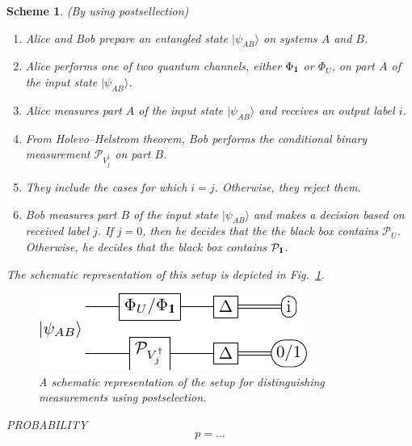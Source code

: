 \documentclass[preprint,12pt, a4paper]{elsarticle}
\newcommand{\ket}[1]{\ensuremath{|#1\rangle}}
\newcommand{\1}{{\rm 1\hspace{-0.9mm}l}}
\newcommand{\Id}{{\rm 1\hspace{-0.9mm}l}}
\newcommand{\PP}{\mathcal{P}}
\newtheorem{scheme}{Scheme}
\begin{document}
\begin{scheme}(By using postsellection)








\begin{enumerate}
\item Alice and Bob prepare an entangled state $\ket{\psi_{AB}}$ on systems 
$A$ and $B$.
\item Alice performs one of two quantum channels, either $\Phi_{\Id}$ or 
$\Phi_{U}$,  on part $A$ of the input state  $\ket{\psi_{AB}}$.
\item Alice measures part $A$ of the input state  $\ket{\psi_{AB}}$ and 
receives an output label $i$.
\item  
From Holevo--Helstrom theorem, Bob performs the conditional binary 
measurement	$\PP_{V_j^\dagger}$ on part $B$.
\item They include the cases for which $i = j$. Otherwise, they reject 
them. 
\item Bob measures part $B$ of the input state  $\ket{\psi_{AB}}$ and makes a
decision based on received label $j$. If $j=0$, then he decides that the the
black box contains $\PP_U$. Otherwise, he decides that the black box contains
$\PP_{\Id}$.
\end{enumerate}


The schematic representation of this setup is depicted in 
Fig.~\ref{fig:postsellection}.     

\begin{figure}[h!]
	\centering 
	\includegraphics[scale=1.7]{pics/postselection} 
	
	\caption{ A schematic representation of the setup for distinguishing
		measurements using postselection. 
	}\label{fig:postsellection}
\end{figure}  


PROBABILITY 
		\begin{equation}
		p = ...
		\end{equation}

\end{scheme}
\end{document}
